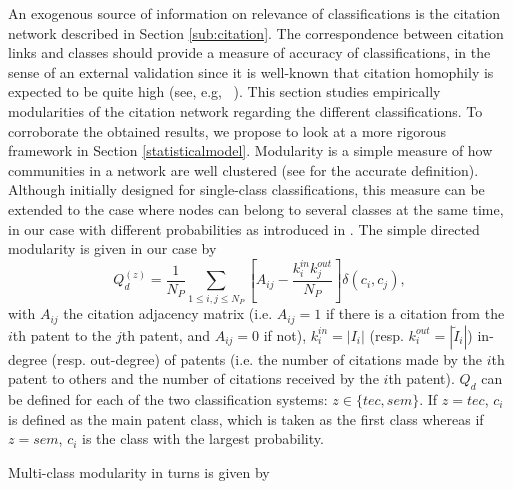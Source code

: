\documentclass[article]{article}%
\begin{document}
An exogenous source of information on relevance of classifications is the citation network described in Section \ref{sub:citation}. The correspondence between citation links and classes should provide a measure of accuracy of classifications, in the sense of an external validation since it is well-known that citation homophily  is expected to be quite high (see, e.g, ~\citealt{AAKnetwork2016}). This section studies empirically modularities of the citation network regarding the different classifications. To corroborate the obtained results, we propose to look at a more rigorous framework in Section \ref{statisticalmodel}. Modularity is a simple measure of how communities in a network are well clustered (see \cite{clauset2004finding} for the accurate definition). Although initially designed for single-class classifications, this measure can be extended to the case where nodes can belong to several classes at the same time, in our case with different probabilities as introduced in \cite{nicosia2009extending}. The simple directed modularity is given in our case by
\[
Q_d^{(z)} = \displaystyle \frac{1}{N_P}\sum_{1\leq i,j\leq N_P}\left[A_{ij} - \frac{k_{i}^{in}k_{j}^{out}}{N_P}\right]\delta(c_i,c_j),
\]
with $A_{ij}$ the citation adjacency matrix (i.e. $A_{ij} = 1$ if there is a citation from the $i$th patent to the $j$th patent, and $A_{ij}=0$ if not), $k_i^{in}=\left| I_i\right|$ (resp. $k_i^{out}= \left|\tilde{I}_i \right|$) in-degree (resp. out-degree) of patents (i.e. the number of citations made by the $i$th patent to others and the number of citations received by the $i$th patent). $Q_d$ can be defined for each of the two classification systems: $z \in \{tec, sem\}$. If $z=tec$, $c_i$ is defined as the main patent class, which is taken as the first class whereas if $z=sem$, $c_i$ is the class with the largest probability.

Multi-class modularity in turns is given by
\end{document}
